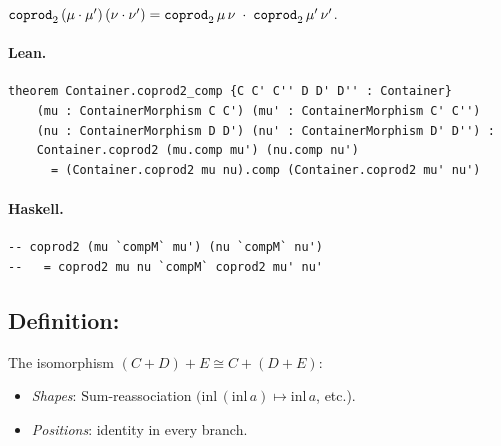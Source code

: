 \documentclass[11pt,a4paper]{article}
\begin{document}
\begin{thm}
$\texttt{coprod}_2\,(\mu \cdot \mu')\,(\nu \cdot \nu')
= \texttt{coprod}_2\,\mu\,\nu \;\cdot\; \texttt{coprod}_2\,\mu'\,\nu'$.
\end{thm}

\paragraph{Lean.}
\begin{lstlisting}[style=lean]
theorem Container.coprod2_comp {C C' C'' D D' D'' : Container}
    (mu : ContainerMorphism C C') (mu' : ContainerMorphism C' C'')
    (nu : ContainerMorphism D D') (nu' : ContainerMorphism D' D'') :
    Container.coprod2 (mu.comp mu') (nu.comp nu')
      = (Container.coprod2 mu nu).comp (Container.coprod2 mu' nu')
\end{lstlisting}

\paragraph{Haskell.}
\begin{lstlisting}[style=haskell]
-- coprod2 (mu `compM` mu') (nu `compM` nu')
--   = coprod2 mu nu `compM` coprod2 mu' nu'
\end{lstlisting}


\subsection{Definition: }

\begin{defn}
The isomorphism $(C + D) + E \cong C + (D + E)$:
\begin{itemize}
  \item \emph{Shapes}: $\mathrm{Sum}$-reassociation
    $(\mathrm{inl}\,(\mathrm{inl}\,a) \mapsto \mathrm{inl}\,a$, etc.).
  \item \emph{Positions}: identity in every branch.
\end{itemize}
\end{defn}
\end{document}
